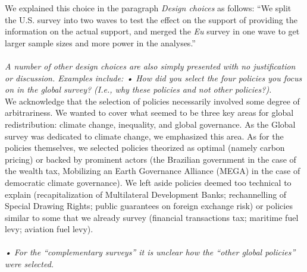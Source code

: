 \documentclass[12pt,english]{article}
\begin{document}

We explained this choice in the paragraph \textit{Design choices} as follows: ``We split the U.S. survey into two waves to test the effect on the support of providing the information on the actual support, and merged the \textit{Eu} survey in one wave to get larger sample sizes and more power in the analyses.''
~\\ ~\\

\textit{A number of other design choices are also simply presented with no justification or discussion. Examples include:
• How did you select the four policies you focus on in the global survey? (I.e., why these policies and not other policies?).}~\\

We acknowledge that the selection of policies necessarily involved some degree of arbitrariness. We wanted to cover what seemed to be three key areas for global redistribution: climate change, inequality, and global governance. As the Global survey was dedicated to climate change, we emphasized this area. As for the policies themselves, we selected policies theorized as optimal (namely carbon pricing) or backed by prominent actors (the Brazilian government in the case of the wealth tax, Mobilizing an Earth Governance Alliance (MEGA) in the case of democratic climate governance). 
We left aside policies deemed too technical to explain (recapitalization of Multilateral Development Banks; rechannelling of Special Drawing Rights; public guarantees on foreign exchange risk) or policies similar to some that we already survey (financial transactions tax; maritime fuel levy; aviation fuel levy). 
~\\ ~\\


\textit{• For the “complementary surveys” it is unclear how the “other global policies” were selected.}~\\
\end{document}

